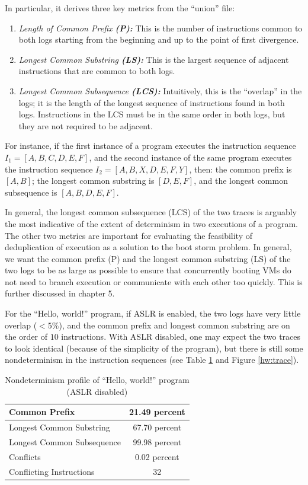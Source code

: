 In particular, it derives three key metrics
from the ``union'' file:
\begin{enumerate}
\item {\em Length of Common Prefix {\bf (P):}} This is 
the number of instructions common
to both logs starting from the beginning
and up to the point of first divergence.
\item {\em Longest Common Substring {\bf (LS):}}
This is the largest sequence of adjacent instructions 
that are common to both logs.
\item {\em Longest Common Subsequence {\bf (LCS):}}
Intuitively, this is the ``overlap'' in the logs;
it is the length of the longest sequence of instructions
found in both logs. Instructions in the LCS must be in the same order
in both logs, but they are not required to be adjacent.
\end{enumerate}

For instance, if the first instance of a program
executes the instruction sequence $I_1 = [A, B, C, D, E, F]$,
and the second instance of the same program executes 
the instruction sequence $I_2 = [A, B, X, D, E, F, Y]$,
then: the common prefix is $[A, B]$; the longest
common substring is $[D, E, F]$, and the longest
common subsequence is $[A, B, D, E, F]$. 

In general, the longest common subsequence (LCS) of the two traces is
arguably the most indicative of the extent of determinism
in two executions of a program.
The other two metrics are important 
for evaluating the feasibility of deduplication of execution as
a solution to the boot storm problem. In general,
we want the common prefix (P) and the longest common substring (LS)
of the two logs to be as large as possible to
ensure that concurrently booting VMs do not need to branch
execution or communicate with each other too quickly. This
is further discussed in chapter 5.

For the ``Hello, world!'' program, if ASLR
is enabled, the two logs have very little
overlap ($< 5\%$), and the common
prefix and longest common substring
are on the order of $10$ instructions.
With ASLR disabled, one may 
expect the two traces to look identical (because
of the simplicity of the program), but
there is still some nondeterminism in the 
instruction sequences (see Table \ref{hw:stats}
and Figure \ref{hw:trace}).

\begin{table}
\caption{Nondeterminism profile of ``Hello, world!'' program (ASLR disabled)}
\label{hw:stats}
\begin{center}
\begin{tabular}{||l|c||}\hline
  Common Prefix & 21.49 percent \\\hline
  Longest Common Substring & 67.70 percent \\\hline
  Longest Common Subsequence & 99.98 percent \\\hline
  Conflicts & 0.02 percent \\\hline
  Conflicting Instructions & 32 \\\hline
\end{tabular}
\end{center}
\end{table}

